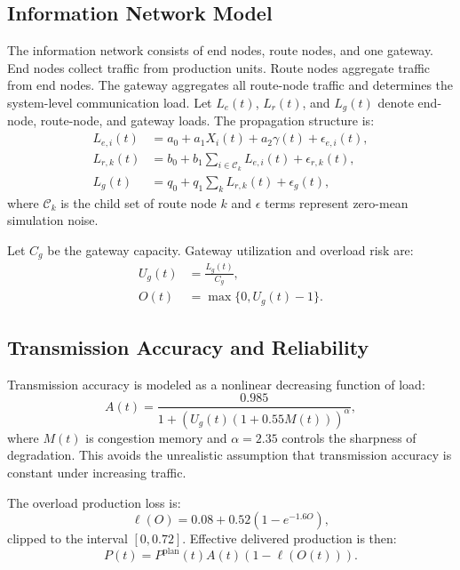 \documentclass[journal]{IEEEtran}
\begin{document}
\subsection{Information Network Model}

The information network consists of end nodes, route nodes, and one gateway. End nodes collect traffic from production units. Route nodes aggregate traffic from end nodes. The gateway aggregates all route-node traffic and determines the system-level communication load. Let $L_e(t)$, $L_r(t)$, and $L_g(t)$ denote end-node, route-node, and gateway loads. The propagation structure is:
\begin{align}
L_{e,i}(t) &= a_0+a_1X_i(t)+a_2\gamma(t)+\epsilon_{e,i}(t),\\
L_{r,k}(t) &= b_0+b_1\sum_{i\in\mathcal{C}_k}L_{e,i}(t)+\epsilon_{r,k}(t),\\
L_g(t) &= q_0+q_1\sum_k L_{r,k}(t)+\epsilon_g(t),
\end{align}
where $\mathcal{C}_k$ is the child set of route node $k$ and $\epsilon$ terms represent zero-mean simulation noise.

Let $C_g$ be the gateway capacity. Gateway utilization and overload risk are:
\begin{align}
U_g(t)&=\frac{L_g(t)}{C_g},\\
O(t)&=\max\{0,U_g(t)-1\}.
\end{align}

\subsection{Transmission Accuracy and Reliability}

Transmission accuracy is modeled as a nonlinear decreasing function of load:
\begin{equation}
A(t)=\frac{0.985}{1+\left(U_g(t)(1+0.55M(t))\right)^\alpha},
\label{eq:accuracy}
\end{equation}
where $M(t)$ is congestion memory and $\alpha=2.35$ controls the sharpness of degradation. This avoids the unrealistic assumption that transmission accuracy is constant under increasing traffic.

The overload production loss is:
\begin{equation}
\ell(O)=0.08+0.52(1-e^{-1.6O}),
\end{equation}
clipped to the interval $[0,0.72]$. Effective delivered production is then:
\begin{equation}
P(t)=P^{\mathrm{plan}}(t)A(t)(1-\ell(O(t))).
\end{equation}
\end{document}
